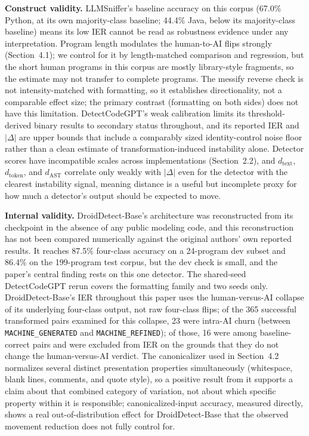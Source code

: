 \documentclass[sigconf,review,anonymous]{acmart}
\begin{document}
\textbf{Construct validity.} LLMSniffer's baseline accuracy on this corpus (67.0\% Python, at its own majority-class baseline; 44.4\% Java, below its majority-class baseline) means its low IER cannot be read as robustness evidence under any interpretation. Program length modulates the human-to-AI flips strongly (Section~4.1); we control for it by length-matched comparison and regression, but the short human programs in this corpus are mostly library-style fragments, so the estimate may not transfer to complete programs. The messify reverse check is not intensity-matched with formatting, so it establishes directionality, not a comparable effect size; the primary contrast (formatting on both sides) does not have this limitation. DetectCodeGPT's weak calibration limits its threshold-derived binary results to secondary status throughout, and its reported IER and $|\Delta|$ are upper bounds that include a comparably sized identity-control noise floor rather than a clean estimate of transformation-induced instability alone. Detector scores have incompatible scales across implementations (Section~2.2), and $d_\text{text}$, $d_\text{token}$, and $d_\text{AST}$ correlate only weakly with $|\Delta|$ even for the detector with the clearest instability signal, meaning distance is a useful but incomplete proxy for how much a detector's output should be expected to move.

\textbf{Internal validity.} DroidDetect-Base's architecture was reconstructed from its checkpoint in the absence of any public modeling code, and this reconstruction has not been compared numerically against the original authors' own reported results. It reaches 87.5\% four-class accuracy on a 24-program dev subset and 86.4\% on the 199-program test corpus, but the dev check is small, and the paper's central finding rests on this one detector. The shared-seed DetectCodeGPT rerun covers the formatting family and two seeds only. DroidDetect-Base's IER throughout this paper uses the human-versus-AI collapse of its underlying four-class output, not raw four-class flips; of the 365 successful transformed pairs examined for this collapse, 23 were intra-AI churn (between \texttt{MACHINE\_GENERATED} and \texttt{MACHINE\_REFINED}); of those, 16 were among baseline-correct pairs and were excluded from IER on the grounds that they do not change the human-versus-AI verdict. The canonicalizer used in Section~4.2 normalizes several distinct presentation properties simultaneously (whitespace, blank lines, comments, and quote style), so a positive result from it supports a claim about that combined category of variation, not about which specific property within it is responsible; canonicalized-input accuracy, measured directly, shows a real out-of-distribution effect for DroidDetect-Base that the observed movement reduction does not fully control for.
\end{document}
